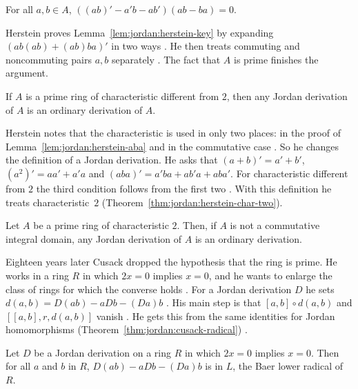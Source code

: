 \begin{lemma}\label{lem:jordan:herstein-key}
For all $a,b\in A$, $((ab)'-a'b-ab')(ab-ba)=0$.
\end{lemma}

Herstein proves Lemma~\ref{lem:jordan:herstein-key} by expanding $(ab(ab)+(ab)ba)'$ in
two ways \cite[p.~1107]{Herstein1957}. He then treats commuting and noncommuting
pairs $a,b$ separately \cite[pp.~1107--1110]{Herstein1957}. The fact that $A$ is prime
finishes the argument.

\begin{theorem}\label{thm:jordan:herstein}
If $A$ is a prime ring of characteristic different from $2$, then any Jordan
derivation of $A$ is an ordinary derivation of $A$.
\end{theorem}

Herstein notes that the characteristic is used in only two places: in the proof of
Lemma~\ref{lem:jordan:herstein-aba} and in the commutative case
\cite[p.~1110]{Herstein1957}. So he changes the definition of a Jordan derivation.
He asks that $(a+b)'=a'+b'$, $(a^{2})'=aa'+a'a$ and $(aba)'=a'ba+ab'a+aba'$. For
characteristic different from $2$ the third condition follows from the first two
\cite[p.~1110]{Herstein1957}. With this definition he treats characteristic~$2$ (Theorem~\ref{thm:jordan:herstein-char-two}).

\begin{theorem}\label{thm:jordan:herstein-char-two}
Let $A$ be a prime ring of characteristic $2$. Then, if $A$ is not a commutative integral
domain, any Jordan derivation of $A$ is an ordinary derivation.
\end{theorem}

Eighteen years later Cusack dropped the hypothesis that the ring is prime. He works
in a ring $R$ in which $2x=0$ implies $x=0$, and he wants to enlarge the class of
rings for which the converse holds \cite[p.~321]{Cusack1975}. For a Jordan derivation
$D$ he sets $d(a,b)=D(ab)-aDb-(Da)b$ \cite[p.~321]{Cusack1975}. His main step is that
$[a,b]\circ d(a,b)$ and $[[a,b],r,d(a,b)]$ vanish \cite[Lemma~2, p.~322]{Cusack1975}.
He gets this from the same identities for Jordan homomorphisms (Theorem~\ref{thm:jordan:cusack-radical})
\cite[Lemma~1, p.~322]{Cusack1975}.\begin{theorem}\label{thm:jordan:cusack-radical}
Let $D$ be a Jordan derivation on a ring $R$ in which $2x=0$ implies $x=0$. Then for
all $a$ and $b$ in $R$, $D(ab)-aDb-(Da)b$ is in $L$, the Baer lower radical of $R$.
\end{theorem}

